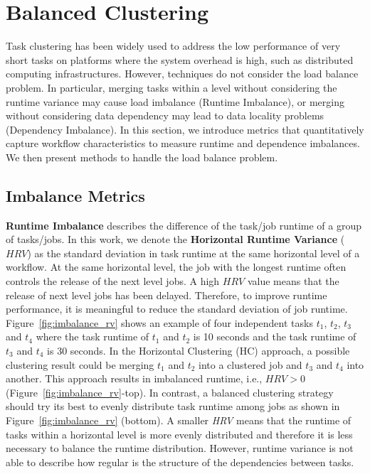 \section{Balanced Clustering}
\label{sec:imbalance}

Task clustering has been widely used to address the low performance of very short tasks on platforms where the system overhead is high, such as distributed computing infrastructures. However, techniques do not consider the load balance problem. In particular, merging tasks within a level without considering the runtime variance may cause load imbalance (Runtime Imbalance), or merging without considering data dependency may lead to data locality problems (Dependency Imbalance).
In this section, we introduce metrics that quantitatively capture workflow characteristics to measure runtime and dependence imbalances. We then present methods to handle the load balance problem.


\subsection{Imbalance Metrics}

\textbf{Runtime Imbalance} describes the difference of the task/job runtime of a group of tasks/jobs. In this work, we denote the \textbf{Horizontal Runtime Variance} ($HRV$) as the standard deviation in task runtime at the same horizontal level of a workflow. At the same horizontal level, the job with the longest runtime often controls the release of the next level jobs. A high $HRV$ value means that the release of next level jobs has been delayed.
Therefore, to improve runtime performance, it is meaningful to reduce the standard deviation of job runtime. Figure~\ref{fig:imbalance_rv} shows an example of four independent tasks $t_1$, $t_2$, $t_3$ and $t_4$ where the task runtime of $t_1$ and $t_2$ is 10 seconds and the task runtime of $t_3$ and $t_4$ is 30 seconds. In the Horizontal Clustering (HC) approach, a possible clustering result could be merging $t_1$ and $t_2$ into a clustered job and $t_3$ and $t_4$ into another. This approach results in imbalanced runtime, i.e., $HRV > 0$ (Figure~\ref{fig:imbalance_rv}-top). In contrast, a balanced clustering strategy should try its best to evenly distribute task runtime among jobs as shown in Figure~\ref{fig:imbalance_rv} (bottom). A smaller \emph{HRV} means that the runtime of tasks within a horizontal level is more evenly distributed and therefore it is less necessary to balance the runtime distribution. However, runtime variance is not able to describe how regular is the structure of the dependencies between tasks.

